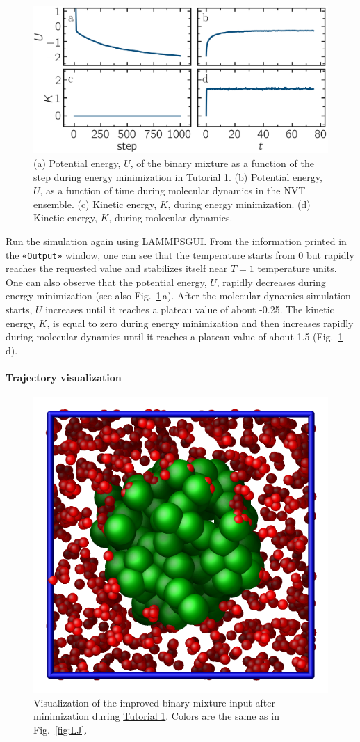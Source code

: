 \documentclass[9pt,tutorial]{livecoms}
\newcommand{\guicmd}[1]{\textcolor{command}{\texttt{«#1»}}} %
\newcommand{\lammpsgui}{\textsf{LAMMPS\textendash GUI}}
\begin{document}
\begin{figure}
\centering
\includegraphics[width=\linewidth]{LJ-energy}
\caption{(a) Potential energy, $U$, of the binary mixture as a function of the
step during energy minimization in \hyperref[lennard-jones-label]{Tutorial 1}.
(b) Potential energy, $U$, as a function of time during molecular dynamics in
the NVT ensemble.  (c) Kinetic energy, $K$, during energy minimization.
(d) Kinetic energy, $K$, during molecular dynamics.}
\label{fig:evolution-energy}
\end{figure}

Run the simulation again using \lammpsgui{}.  From the information
printed in the \guicmd{Output} window, one can see that the temperature
starts from 0 but rapidly reaches the requested value and
stabilizes itself near $T=1$ temperature units.  One can also observe that
the potential energy, $U$, rapidly decreases during energy
minimization (see also Fig.~\ref{fig:evolution-energy}\,a).  After
the molecular dynamics simulation starts, $U$ increases until
it reaches a plateau value of about -0.25.  The kinetic energy,
$K$, is equal to zero during energy minimization and then
increases rapidly during molecular dynamics until it reaches
a plateau value of about 1.5 (Fig.~\ref{fig:evolution-energy}\,d).

\paragraph{Trajectory visualization}

\begin{figure}
\centering
\includegraphics[width=0.55\linewidth]{LJ-cylinder}
\caption{Visualization of the improved binary mixture input after minimization
  during \hyperref[lennard-jones-label]{Tutorial 1}.  Colors are the same as in
  Fig.~\ref{fig:LJ}.}
\label{fig:improved-min}
\end{figure}
\end{document}

